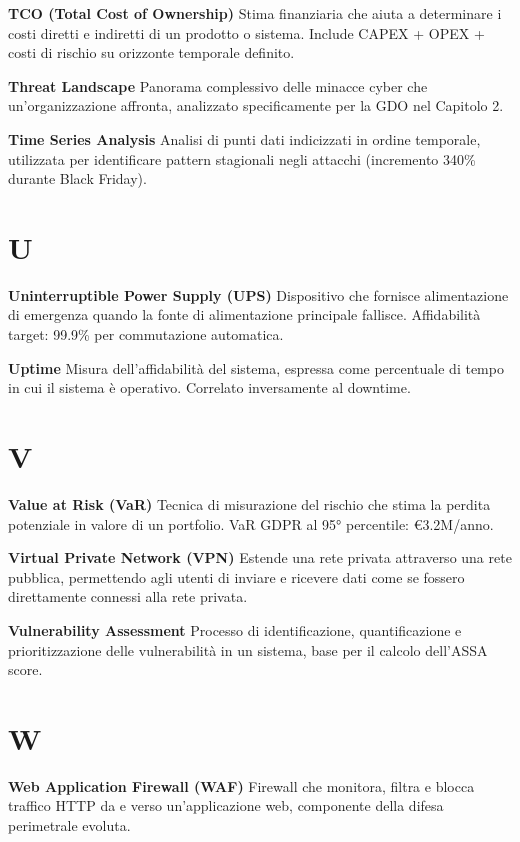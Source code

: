\documentclass[12pt,a4paper,oneside]{book}
\numberwithin{figure}{chapter} %
\numberwithin{table}{chapter}  %
\begin{document}
\textbf{TCO (Total Cost of Ownership)} Stima finanziaria che aiuta a
determinare i costi diretti e indiretti di un prodotto o sistema.
Include CAPEX + OPEX + costi di rischio su orizzonte temporale definito.

\textbf{Threat Landscape} Panorama complessivo delle minacce cyber che
un'organizzazione affronta, analizzato specificamente per la GDO nel
Capitolo 2.

\textbf{Time Series Analysis} Analisi di punti dati indicizzati in
ordine temporale, utilizzata per identificare pattern stagionali negli
attacchi (incremento 340\% durante Black Friday).

\section{U}\label{u}

\textbf{Uninterruptible Power Supply (UPS)} Dispositivo che fornisce
alimentazione di emergenza quando la fonte di alimentazione principale
fallisce. Affidabilità target: 99.9\% per commutazione automatica.

\textbf{Uptime} Misura dell'affidabilità del sistema, espressa come
percentuale di tempo in cui il sistema è operativo. Correlato
inversamente al downtime.

\section{V}\label{v}

\textbf{Value at Risk (VaR)} Tecnica di misurazione del rischio che
stima la perdita potenziale in valore di un portfolio. VaR GDPR al 95°
percentile: €3.2M/anno.

\textbf{Virtual Private Network (VPN)} Estende una rete privata
attraverso una rete pubblica, permettendo agli utenti di inviare e
ricevere dati come se fossero direttamente connessi alla rete privata.

\textbf{Vulnerability Assessment} Processo di identificazione,
quantificazione e prioritizzazione delle vulnerabilità in un sistema,
base per il calcolo dell'ASSA score.

\section{W}\label{w}

\textbf{Web Application Firewall (WAF)} Firewall che monitora, filtra e
blocca traffico HTTP da e verso un'applicazione web, componente della
difesa perimetrale evoluta.
\end{document}
